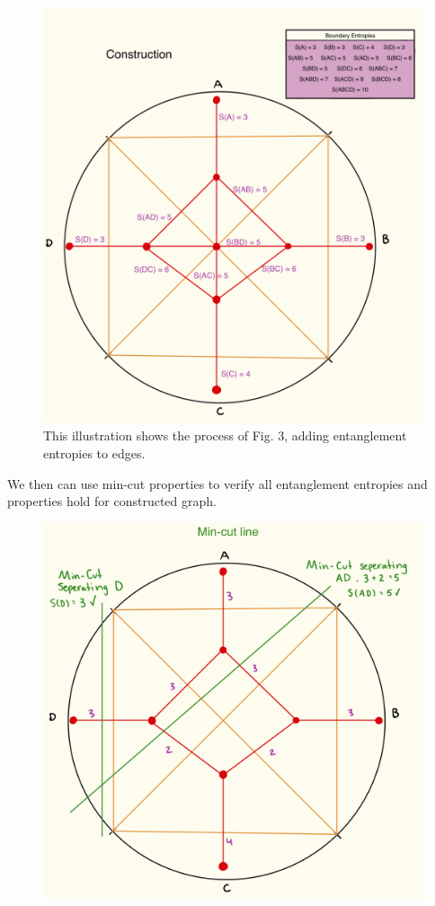 \documentclass[12pt]{article}
\begin{document}
    \begin{figure}[htbp]
        \centering
        \includegraphics[width=1.1\textwidth, height=.85\textheight]{construction.jpeg}  
        \caption{This illustration shows the process of Fig. 3, adding entanglement entropies to edges.}  
        \label{fig:construction}  
    \end{figure}

We then can use min-cut properties to verify all entanglement entropies and properties hold for constructed graph.

\begin{figure}[htbp]
    \centering
    \includegraphics[width=1.1\textwidth, height=.85\textheight]{mincut.jpeg}  
    \caption{}  
    \label{fig:mincut}  
\end{figure}
\end{document}
